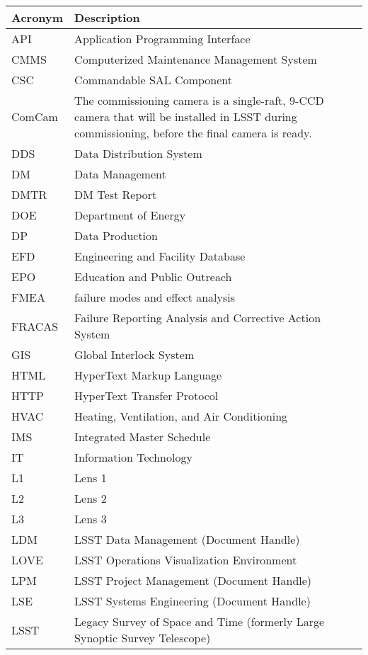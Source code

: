 \addtocounter{table}{-1}
\begin{longtable}{p{}p{}}\hline
\textbf{Acronym} & \textbf{Description}  \\\hline

API & Application Programming Interface \\\hline
CMMS & Computerized Maintenance Management System \\\hline
CSC & Commandable SAL Component \\\hline
ComCam & The commissioning camera is a single-raft, 9-CCD camera that will be installed in LSST during commissioning, before the final camera is ready. \\\hline
DDS & Data Distribution System \\\hline
DM & Data Management \\\hline
DMTR & DM Test Report \\\hline
DOE & Department of Energy \\\hline
DP & Data Production \\\hline
EFD & Engineering and Facility Database \\\hline
EPO & Education and Public Outreach \\\hline
FMEA & failure modes and effect analysis \\\hline
FRACAS & Failure Reporting Analysis and Corrective Action System \\\hline
GIS & Global Interlock System \\\hline
HTML & HyperText Markup Language \\\hline
HTTP & HyperText Transfer Protocol \\\hline
HVAC & Heating, Ventilation, and Air Conditioning \\\hline
IMS & Integrated Master Schedule \\\hline
IT & Information Technology \\\hline
L1 & Lens 1 \\\hline
L2 & Lens 2 \\\hline
L3 & Lens 3 \\\hline
LDM & LSST Data Management (Document Handle) \\\hline
LOVE & LSST Operations Visualization Environment \\\hline
LPM & LSST Project Management (Document Handle) \\\hline
LSE & LSST Systems Engineering (Document Handle) \\\hline
LSST & Legacy Survey of Space and Time (formerly Large Synoptic Survey Telescope) \\\hline

\end{longtable}

